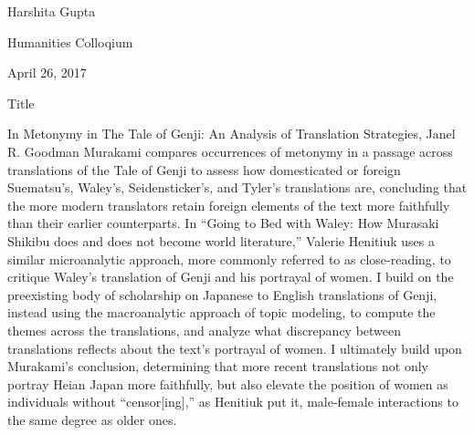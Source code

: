 \documentclass[12pt]{article}
\begin{document}
\begin{flushleft}
	

\begin{spacing}{2.0}
Harshita Gupta

Humanities Colloqium 

April 26, 2017

\begin{center}
Title
\end{center}

\setlength{\parindent}{0.5in} 

In Metonymy in The Tale of Genji: An Analysis of Translation Strategies, Janel R. Goodman Murakami compares occurrences of metonymy in a passage across translations of the Tale of Genji to assess how domesticated or foreign Suematsu’s, Waley’s, Seidensticker’s, and Tyler’s translations are, concluding that the more modern translators retain foreign elements of the text more faithfully than their earlier counterparts. In “Going to Bed with Waley: How Murasaki Shikibu does and does not become world literature,” Valerie Henitiuk uses a similar microanalytic approach, more commonly referred to as close-reading, to critique Waley’s translation of Genji and his portrayal of women. I build on the preexisting body of scholarship on Japanese to English translations of Genji, instead using the macroanalytic approach of topic modeling, to compute the themes across the translations, and analyze what discrepancy between translations reflects about the text’s portrayal of women. I ultimately build upon Murakami’s conclusion, determining that more recent translations not only portray Heian Japan more faithfully, but also elevate the position of women as individuals without “censor[ing],” as Henitiuk put it, male-female interactions to the same degree as older ones. 

\end{spacing}
\end{flushleft}
\end{document}
